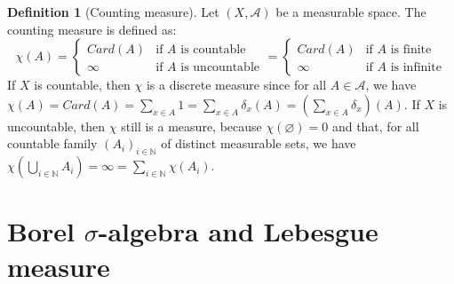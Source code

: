 \documentclass{article}
\newtheorem{theorem}{Theorem}[section]
\theoremstyle{definition}
\newtheorem{definition}{Definition}[section]
\theoremstyle{remark}
\theoremstyle{example}
\theoremstyle{notation}
\newcommand{\tif}{\text{if }}
\begin{document}
\begin{definition}[Counting measure]
    Let $(X, \mathcal{A})$ be a measurable space. The counting measure is defined as:
        $$\chi(A) = \begin{cases} Card(A) & \tif A \text{ is countable}\\ \infty & \tif A \text{ is uncountable}\end{cases} = \begin{cases}Card(A) & \tif A \text{ is finite}\\ \infty & \tif A \text{ is infinite}\end{cases}$$
		If $X$ is countable, then $\chi$ is a discrete measure since for all $A \in \mathcal{A}$, we have $\chi(A) = Card(A) = \sum_{x \in A} 1 = \sum_{x \in A} \delta_x(A) = \left(\sum_{x \in A} \delta_x\right)(A)$. If $X$ is uncountable, then $\chi$ still is a measure, because $\chi(\varnothing)=0$ and that, for all countable family $(A_i)_{i \in \mathbb{N}}$ of distinct measurable sets, we have $\chi(\bigcup_{i\in\mathbb{N}} A_i) = \infty = \sum_{i\in\mathbb{N}} \chi(A_i)$.
\end{definition}


\section{Borel $\sigma$-algebra and Lebesgue measure}
\end{document}
